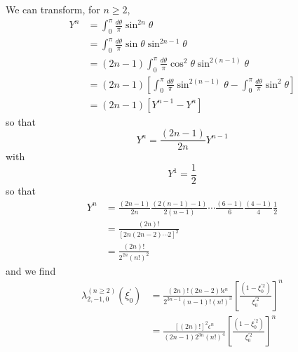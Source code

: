 We can transform, for $n\geq2$,%
\begin{align*}
Y^{n}  &  =\int_{0}^{\pi}\frac{d\theta}{\pi}\sin^{2n}\theta\\
&  =\int_{0}^{\pi}\frac{d\theta}{\pi}\sin\theta\sin^{2n-1}\theta\\
&  =\left(  2n-1\right)  \int_{0}^{\pi}\frac{d\theta}{\pi}\cos^{2}\theta
\sin^{2\left(  n-1\right)  }\theta\\
&  =\left(  2n-1\right)  \left[  \int_{0}^{\pi}\frac{d\theta}{\pi}%
\sin^{2\left(  n-1\right)  }\theta-\int_{0}^{\pi}\frac{d\theta}{\pi}\sin
^{2}\theta\right] \\
&  =\left(  2n-1\right)  \left[  Y^{n-1}-Y^{n}\right]
\end{align*}
so that%
\[
Y^{n}=\frac{\left(  2n-1\right)  }{2n}Y^{n-1}%
\]
with%
\[
Y^{1}=\frac{1}{2}%
\]
so that%
\begin{align*}
Y^{n}  &  =\frac{\left(  2n-1\right)  }{2n}\frac{\left(  2\left(  n-1\right)
-1\right)  }{2\left(  n-1\right)  }\cdots\frac{\left(  6-1\right)  }{6}%
\frac{\left(  4-1\right)  }{4}\frac{1}{2}\\
&  =\frac{\left(  2n\right)  !}{\left[  2n\left(  2n-2\right)  \cdots2\right]
^{2}}\\
&  =\frac{\left(  2n\right)  !}{2^{2n}\left(  n!\right)  ^{2}}%
\end{align*}
and we find%
\begin{align}
\lambda_{2,-1,0}^{(n\geq2)}\left(  \xi_{0}^{\prime}\right)   &  =\frac{\left(
2n\right)  !\left(  2n-2\right)  !\epsilon^{n}}{2^{3n-1}\left(  n-1\right)
!\left(  n!\right)  ^{3}}\left[  \frac{\left(  1-\xi_{0}^{\prime2}\right)
}{\xi_{0}^{\prime2}}\right]  ^{n}\\
&  =\frac{\left[  \left(  2n\right)  !\right]  ^{2}\epsilon^{n}}{\left(
2n-1\right)  2^{3n}\left(  n!\right)  ^{4}}\left[  \frac{\left(  1-\xi
_{0}^{\prime2}\right)  }{\xi_{0}^{\prime2}}\right]  ^{n}%
\end{align}

